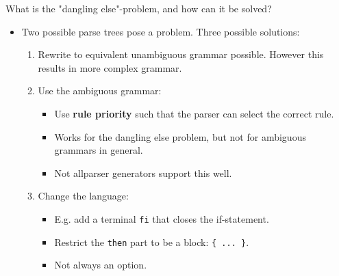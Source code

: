 \documentclass[11pt]{beamer}
\begin{document}
\begin{frame}

\begin{block}{What is the "dangling else"-problem, and how can it be solved?}
\begin{itemize}
\item Two possible parse trees pose a problem. Three possible solutions:
\begin{enumerate}
\item Rewrite to equivalent unambiguous grammar possible. However this results in more complex grammar.
\item Use the ambiguous grammar:
\begin{itemize}
\item Use \textbf{rule priority} such that the parser can select the correct rule.
\item Works for the dangling else problem, but not for ambiguous grammars in general.
\item Not allparser generators support this well.
\end{itemize}
\item Change the language:
\begin{itemize}
\item E.g. add a terminal \texttt{fi} that closes the if-statement.
\item Restrict the \texttt{then} part to be a block: \texttt{\{ ... \}}.
\item Not always an option.
\end{itemize}
\end{enumerate}
\end{itemize}
\end{block}
\end{frame}
\end{document}
